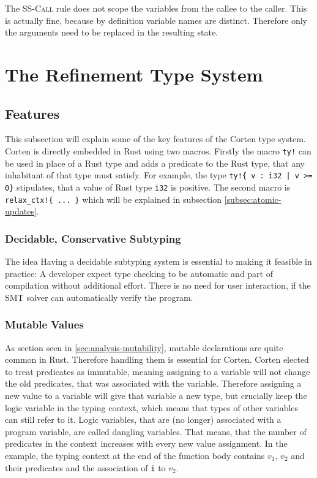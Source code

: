 \documentclass{book}
\newcommand{\code}[1]{\texttt{#1}}
\theoremstyle{definition}
\begin{document}
The \textsc{SS-Call} rule does not scope the variables from the callee to the caller. This is actually fine, because by definition variable names are distinct. Therefore only the arguments need to be replaced in the resulting state.

\chapter{The Refinement Type System}


\section{Features}

This subsection will explain some of the key features of the Corten type system.
Corten is directly embedded in Rust using two macros. Firstly the macro \code{ty!} can be used in place of a Rust type and adds a predicate to the Rust type, that any inhabitant of that type must satisfy. For example, the type \code{ty!\{ v : i32 | v >= 0\}} stipulates, that a value of Rust type \code{i32} is positive. The second macro is \code{relax\_ctx!\{ ... \}} which will be explained in subsection \ref{subsec:atomic-updates}.

\subsection{Decidable, Conservative Subtyping}

The idea 
Having a decidable subtyping system is essential to making it feasible in practice: A developer expect type checking to be automatic and part of compilation without additional effort. There is no need for user interaction, if the SMT solver can automatically verify the program.

\subsection{Mutable Values}

As section seen in \ref{sec:analysis-mutability}, mutable declarations are quite common in Rust. Therefore handling them is essential for Corten.
Corten elected to treat predicates as immutable, meaning assigning to a variable will not change the old predicates, that was associated with the variable.
Therefore assigning a new value to a variable will give that variable a new type, but \- crucially \- keep the logic variable in the typing context, which means that types of other variables can still refer to it. Logic variables, that are (no longer) associated with a program variable, are called dangling variables.
That means, that the number of predicates in the context increases with every new value assignment.
In the example, the typing context at the end of the function body contains $v_1$, $v_2$ and their predicates and the association of \code{i} to $v_2$.
\end{document}
